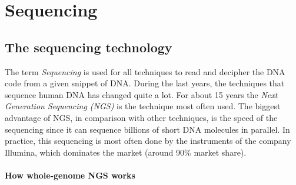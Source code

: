 \section{Sequencing}

\subsection{The sequencing technology}

The term \emph{Sequencing} is used for all techniques to read and decipher the DNA code from a given snippet of DNA. During the last years, the techniques that sequence human DNA has changed quite a lot. For about 15 years the \emph{Next Generation Sequencing (NGS)} is the technique most often used. The biggest advantage of NGS, in comparison with other techniques, is the speed of the sequencing since it can sequence billions of short DNA molecules in parallel. In practice, this sequencing is most often done by the instruments of the company Illumina, which dominates the market (around 90\% market share).

\paragraph{How whole-genome NGS works}

